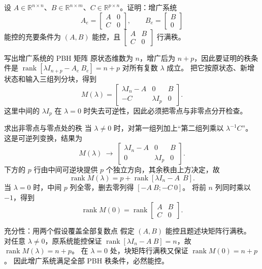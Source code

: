 \documentclass[11pt]{article}
\begin{document}
\begin{problem}[原题 14]
设 $A\in\mathbb R^{n\times n}$、$B\in\mathbb R^{n\times m}$、$C\in\mathbb R^{p\times n}$。证明：增广系统
\[
A_e=\begin{bmatrix}A&0\\C&0\end{bmatrix},\qquad
B_e=\begin{bmatrix}B\\0\end{bmatrix}
\]
能控的充要条件为 $(A,B)$ 能控，且 $\begin{bmatrix}A&B\\C&0\end{bmatrix}$ 行满秩。
\end{problem}
\begin{solution}
\begin{proofstep}{写出增广系统的 PBH 矩阵}
原状态维数为 $n$，增广后为 $n+p$，因此要证明的秩条件是
$\operatorname{rank}[\lambda I_{n+p}-A_e\ B_e]=n+p$ 对所有复数 $\lambda$ 成立。
把它按原状态、新增状态和输入三组列分块，得到
\[
M(\lambda)=\begin{bmatrix}\lambda I_n-A&0&B\\-C&\lambda I_p&0\end{bmatrix}.
\]
这里中间的 $\lambda I_p$ 在 $\lambda=0$ 时失去可逆性，因此必须把零点与非零点分开检查。
\end{proofstep}

\begin{proofstep}{求出非零点与零点处的秩}
当 $\lambda\ne0$ 时，对第一组列加上“第二组列乘以 $\lambda^{-1}C$”。
这是可逆列变换，结果为
\[
M(\lambda)\ \longrightarrow\
\begin{bmatrix}\lambda I_n-A&0&B\\0&\lambda I_p&0\end{bmatrix}.
\]
下方的 $p$ 行由中间可逆块提供 $p$ 个独立方向，其余秩由上方决定，故
\[
\operatorname{rank}M(\lambda)
=p+\operatorname{rank}[\lambda I_n-A\ \ B].
\]
当 $\lambda=0$ 时，中间 $p$ 列全零，删去零列得 $[-A\ B;-C\ 0]$。
将前 $n$ 列同时乘以 $-1$，得到
\[
\operatorname{rank}M(0)
=\operatorname{rank}\begin{bmatrix}A&B\\C&0\end{bmatrix}.
\]
\end{proofstep}

\begin{proofstep}{充分性：用两个假设覆盖全部复数点}
假定 $(A,B)$ 能控且题述块矩阵行满秩。
对任意 $\lambda\ne0$，原系统能控保证
$\operatorname{rank}[\lambda I_n-A\ B]=n$，故 $\operatorname{rank}M(\lambda)=n+p$。
在 $\lambda=0$ 处，块矩阵行满秩又保证 $\operatorname{rank}M(0)=n+p$。
因此增广系统满足全部 PBH 秩条件，必然能控。
\end{proofstep}


\end{solution}
\end{document}
